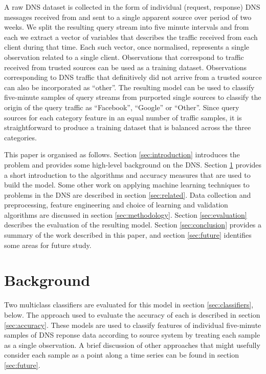 \documentclass[conference]{IEEEtran}
\begin{document}
A raw DNS dataset is collected in the form of individual (request,
response) DNS messages received from and sent to a single apparent
source over period of two weeks. We split the resulting query stream
into five minute intervals and from each we extract a vector of
variables that describes the traffic received from each client during
that time. Each such vector, once normalised, represents a single
observation related to a single client. Observations that correspond to
traffic received from trusted sources can be used as a training dataset.
Observations corresponding to DNS traffic that definitively did not
arrive from a trusted source can also be incorporated as ``other''. The
resulting model can be used to classify five-minute samples of query
streams from purported single sources to classify the origin of the
query traffic as ``Facebook'', ``Google'' or ``Other''. Since query
sources for each category feature in an equal number of traffic samples,
it is straightforward to produce a training dataset that is balanced
across the three categories.

This paper is organised as follows. Section \ref{sec:introduction}
introduces the problem and provides some high-level background on the
DNS. Section \ref{sec:background} provides a short introduction to the
algorithms and accuracy measures that are used to build the model. Some
other work on applying machine learning techniques to problems in the
DNS are described in section \ref{sec:related}. Data collection and
preprocessing, feature engineering and choice of learning and validation
algorithms are discussed in section \ref{sec:methodology}. Section
\ref{sec:evaluation} describes the evaluation of the resulting model.
Section \ref{sec:conclusion} provides a summary of the work described in
this paper, and section \ref{sec:future} identifies some areas for
future study.

\section{Background}\label{sec:background}

\label{sec:background}

Two multiclass classifiers are evaluated for this model in section
\ref{sec:classifiers}, below. The approach used to evaluate the accuracy
of each is described in section \ref{sec:accuracy}. These models are
used to classify features of individual five-minute samples of DNS
reponse data according to source system by treating each sample as a
single observation. A brief discussion of other approaches that might
usefully consider each sample as a point along a time series can be
found in section \ref{sec:future}.
\end{document}
